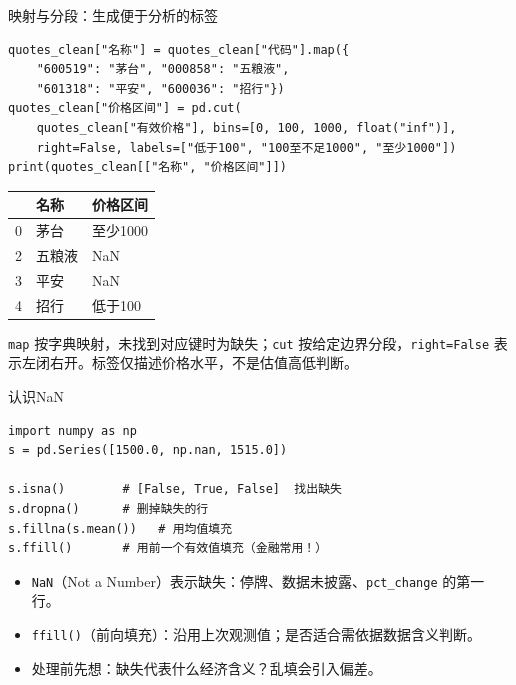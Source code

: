 \documentclass[9pt]{ctexbeamer}
\begin{document}
\begin{frame}[fragile]{映射与分段：生成便于分析的标签}
\begin{lstlisting}[basicstyle=\ttfamily\scriptsize]
quotes_clean["名称"] = quotes_clean["代码"].map({
    "600519": "茅台", "000858": "五粮液",
    "601318": "平安", "600036": "招行"})
quotes_clean["价格区间"] = pd.cut(
    quotes_clean["有效价格"], bins=[0, 100, 1000, float("inf")],
    right=False, labels=["低于100", "100至不足1000", "至少1000"])
print(quotes_clean[["名称", "价格区间"]])
\end{lstlisting}
\begin{center}
\begin{tabular}{rll}
\toprule
 & 名称 & 价格区间 \\
\midrule
0 & 茅台 & 至少1000 \\
2 & 五粮液 & NaN \\
3 & 平安 & NaN \\
4 & 招行 & 低于100 \\
\bottomrule
\end{tabular}
\end{center}
\small \texttt{map} 按字典映射，未找到对应键时为缺失；\texttt{cut} 按给定边界分段，\texttt{right=False} 表示左闭右开。标签仅描述价格水平，不是估值高低判断。
\end{frame}
\begin{frame}[fragile]{认识NaN}
	\begin{lstlisting}
import numpy as np
s = pd.Series([1500.0, np.nan, 1515.0])

s.isna()        # [False, True, False]  找出缺失
s.dropna()      # 删掉缺失的行
s.fillna(s.mean())   # 用均值填充
s.ffill()       # 用前一个有效值填充（金融常用！）
\end{lstlisting}
	\begin{itemize}
		\item \texttt{NaN}（Not a Number）表示缺失：停牌、数据未披露、\texttt{pct\_change} 的第一行。
		\item \texttt{ffill()}（前向填充）：沿用上次观测值；是否适合需依据数据含义判断。
		\item 处理前先想：缺失代表什么经济含义？乱填会引入偏差。
	\end{itemize}
\end{frame}
\end{document}
